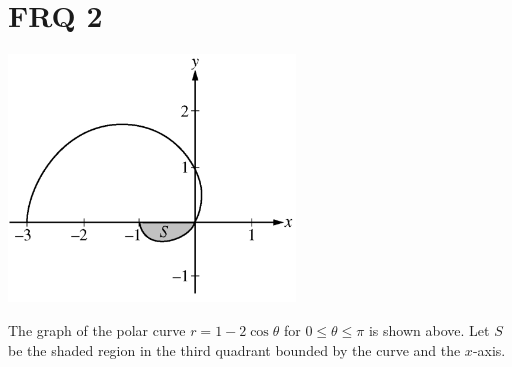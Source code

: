 \documentclass[12pt]{article}
\begin{document}
\section*{FRQ 2}
\begin{center}
	\includegraphics[width = 3in]{FRQ2.png}
\end{center}
The graph of the polar curve $r = 1- 2\cos\theta$ for $0 \leq \theta \leq \pi$ is shown above. Let $S$ be the shaded region in the third quadrant bounded by the curve and the $x$-axis. 
\end{document}
